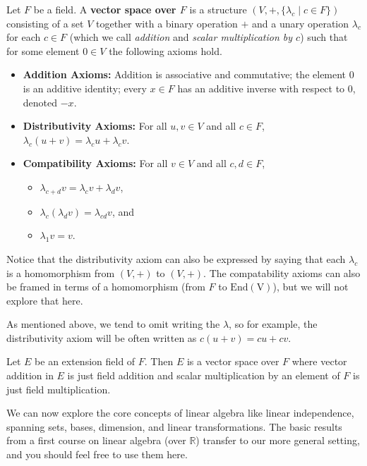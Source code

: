 \begin{definition}
Let $F$ be a field. A \textbf{vector space over $F$} is a structure $(V,+,\{\lambda_c\mid c\in F\})$ consisting of a set $V$ together with a binary operation $+$ and a unary operation $\lambda_c$ for each $c\in F$ (which we call \emph{addition} and \emph{scalar multiplication by $c$}) such that for some element $0\in V$ the following axioms hold.
\begin{itemize}
\item \textbf{Addition Axioms:} Addition is associative and commutative; the element $0$ is an additive identity; every  $x\in F$ has an additive inverse with respect to $0$, denoted $-x$.
\item \textbf{Distributivity Axioms:} For all $u,v \in V$ and all $c\in F$, $\lambda_c(u+v) = \lambda_cu+\lambda_cv$.
\item \textbf{Compatibility Axioms:} For all $v \in V$ and all $c,d\in F$, 
\begin{itemize}[label = $\circ$]
\item $\lambda_{c+d}v = \lambda_cv + \lambda_dv$,
\item $\lambda_c(\lambda_dv) = \lambda_{cd}v$, and
\item $\lambda_1v = v$.
\end{itemize}
\end{itemize}
\end{definition}

Notice that the distributivity axiom can also be expressed by saying that each $\lambda_c$ is a homomorphism from $(V,+)$ to $(V,+)$. The compatability axioms can also be framed in terms of a homomorphism (from $F$ to $\operatorname{End(V)}$), but we will not explore that here.

As mentioned above, we tend to omit writing the $\lambda$, so for example, the distributivity axiom will be often written as $c(u+v) = cu+cv$.

\begin{theorem}
Let $E$ be an extension field of $F$. Then $E$ is a vector space over $F$ where vector addition in $E$ is just field addition and scalar multiplication by an element of $F$ is just field multiplication.
\end{theorem}

We can now explore the core concepts of linear algebra like linear independence, spanning sets, bases, dimension, and linear transformations. The basic results from a first course on linear algebra (over $\mathbb{R}$) transfer to our more general setting, and you should feel free to use them here. 

